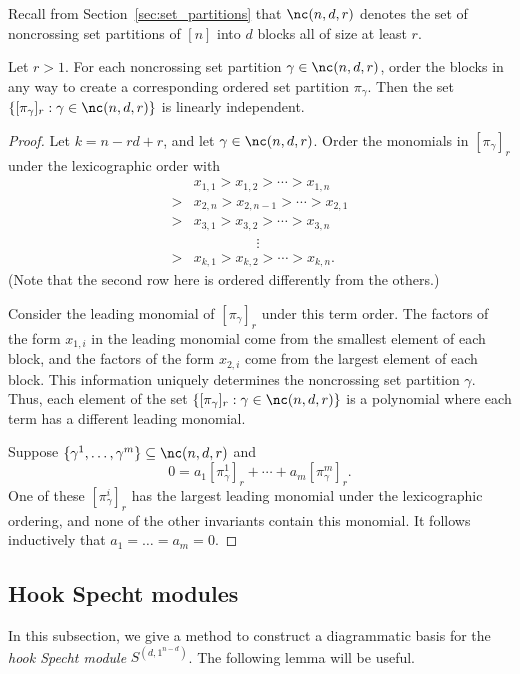 Recall from Section~\ref{sec:set_partitions} that $\nc(n,d,r)$ denotes the set of noncrossing set partitions of $[n]$ into $d$ blocks all of size at least $r$.

\begin{theorem}\label{thm:linind}
Let $r> 1$. For each noncrossing set partition $\gamma \in \nc(n,d,r)$, order the blocks in any way to create a corresponding ordered set partition $\pi_\gamma$. Then the set $\{ [\pi_\gamma]_r : \gamma \in \nc(n,d,r) \}$ is linearly independent.
\end{theorem}
\begin{proof}
Let $k = n - r d + r$, and let $\gamma\in\nc(n,d,r)$. Order the monomials in $[\pi_\gamma]_r$ under the lexicographic order with 
\begin{align*} &x_{1,1} > x_{1,2} > \cdots > x_{1,n}  \\
> &x_{2,n} > x_{2,n-1} > \cdots >x_{2,1}\\
> &x_{3,1}>x_{3,2} >\cdots>x_{3,n}\\
&\phantom{asasdfdsf} \vdots\\
> &x_{k,1}>x_{k,2} >\cdots > x_{k,n}.
\end{align*}
(Note that the second row here is ordered differently from the others.)

Consider the leading monomial of $[\pi_\gamma]_r$ under this term order. The factors of the form $x_{1,i}$ in the leading monomial come from the smallest element of each block, and the factors of the form $x_{2,i}$ come from the largest element of each block. This information uniquely determines the noncrossing set partition $\gamma$.
Thus, each element of the set $\{ [\pi_\gamma]_r : \gamma \in \nc(n,d,r) \}$ is a polynomial where each term has a different leading monomial. 

Suppose $\{\gamma^1,\ldots,\gamma^m\}\subseteq \nc(n,d,r)$ and \[0=a_1[\pi_\gamma^1]_r+\cdots+a_m[\pi_\gamma^m]_r.\]
One of these $[\pi_\gamma^i]_r$ has the largest leading monomial under the lexicographic ordering, and none of the other invariants contain this monomial. It follows inductively that $a_1=\dots=a_m=0$.
\end{proof}

\subsection{Hook Specht modules}\label{sec:hook}

In this subsection, we give a method to construct a diagrammatic basis for the \emph{hook Specht module} $S^{(d,1^{n-d})}$. The following lemma will be useful.

